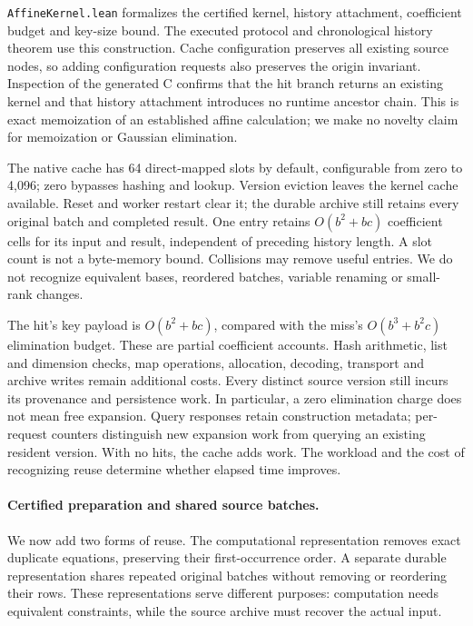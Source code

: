 \documentclass[11pt,a4paper]{article}
\numberwithin{equation}{section}
\theoremstyle{plain}
\theoremstyle{definition}
\theoremstyle{remark}
\begin{document}
\texttt{AffineKernel.lean} formalizes the certified kernel, history attachment, coefficient budget and key-size bound. The executed protocol and chronological history theorem use this construction. Cache configuration preserves all existing source nodes, so adding configuration requests also preserves the origin invariant. Inspection of the generated C confirms that the hit branch returns an existing kernel and that history attachment introduces no runtime ancestor chain. This is exact memoization of an established affine calculation; we make no novelty claim for memoization or Gaussian elimination.

The native cache has 64 direct-mapped slots by default, configurable from zero to 4,096; zero bypasses hashing and lookup. Version eviction leaves the kernel cache available. Reset and worker restart clear it; the durable archive still retains every original batch and completed result. One entry retains $O(b^2+bc)$ coefficient cells for its input and result, independent of preceding history length. A slot count is not a byte-memory bound. Collisions may remove useful entries. We do not recognize equivalent bases, reordered batches, variable renaming or small-rank changes.

The hit's key payload is $O(b^2+bc)$, compared with the miss's $O(b^3+b^2c)$ elimination budget. These are partial coefficient accounts. Hash arithmetic, list and dimension checks, map operations, allocation, decoding, transport and archive writes remain additional costs. Every distinct source version still incurs its provenance and persistence work. In particular, a zero elimination charge does not mean free expansion. Query responses retain construction metadata; per-request counters distinguish new expansion work from querying an existing resident version. With no hits, the cache adds work. The workload and the cost of recognizing reuse determine whether elapsed time improves.

\paragraph{Certified preparation and shared source batches.}
We now add two forms of reuse. The computational representation removes exact duplicate equations, preserving their first-occurrence order. A separate durable representation shares repeated original batches without removing or reordering their rows. These representations serve different purposes: computation needs equivalent constraints, while the source archive must recover the actual input.
\end{document}
